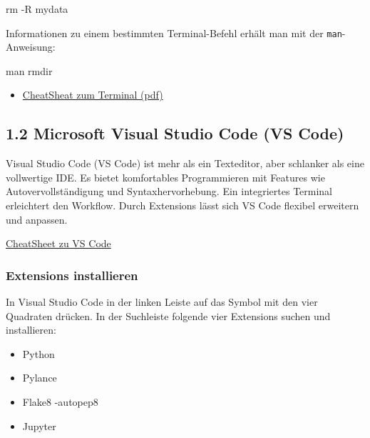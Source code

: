 \documentclass[
  11pt,
  a4paper,
  DIV=11,
  numbers=noendperiod]{scrartcl}
\newenvironment{Shaded}{\begin{snugshade}}{\end{snugshade}}
\newcommand{\NormalTok}[1]{\textcolor[rgb]{0.00,0.23,0.31}{#1}}
\newcommand{\OperatorTok}[1]{\textcolor[rgb]{0.37,0.37,0.37}{#1}}
\providecommand{\tightlist}{%
  \setlength{\itemsep}{0pt}\setlength{\parskip}{0pt}}\usepackage{longtable,booktabs,array}
\begin{document}
\begin{Shaded}
\begin{Highlighting}[numbers=left,,]
\NormalTok{rm }\OperatorTok{{-}}\NormalTok{R mydata}
\end{Highlighting}
\end{Shaded}

Informationen zu einem bestimmten Terminal-Befehl erhält man mit der
\texttt{man}-Anweisung:

\begin{Shaded}
\begin{Highlighting}[numbers=left,,]
\NormalTok{man rmdir}
\end{Highlighting}
\end{Shaded}

\begin{itemize}
\tightlist
\item
  \href{1_Programming_Introduction/1_Python_Programming/1-1_Setup/1-1_Setup.ipynb}{CheatSheat
  zum Terminal (pdf)}
\end{itemize}

\subsection{1.2 Microsoft Visual Studio Code (VS
Code)}\label{microsoft-visual-studio-code-vs-code}

Visual Studio Code (VS Code) ist mehr als ein Texteditor, aber schlanker
als eine vollwertige IDE. Es bietet komfortables Programmieren mit
Features wie Autovervollständigung und Syntaxhervorhebung. Ein
integriertes Terminal erleichtert den Workflow. Durch Extensions lässt
sich VS Code flexibel erweitern und anpassen.

\href{1_Programming_Introduction/1_Python_Programming/1-1_Setup/1-1_CheatSheet_VSCode.pdf}{CheatSheet
zu VS Code}

\subsubsection{Extensions installieren}\label{extensions-installieren}

In Visual Studio Code in der linken Leiste auf das Symbol mit den vier
Quadraten drücken. In der Suchleiste folgende vier Extensions suchen und
installieren:

\begin{itemize}
\tightlist
\item
  Python
\item
  Pylance
\item
  Flake8 -autopep8
\item
  Jupyter
\end{itemize}
\end{document}
